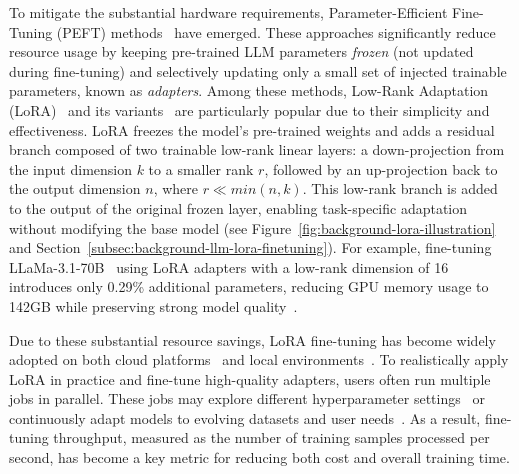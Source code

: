 \begin{sloppypar}
To mitigate the substantial hardware requirements, Parameter-Efficient Fine-Tuning (PEFT) methods~\cite{hu2022lora,li2021prefix-tuning,lester2021prompt-tuning,kopiczko2023vera,liu2024dora,dettmers2023qlora,li2023loftq,ding2023sparse-low-rank-adaptation,houlsby2019peft-learning-nlp,lin2020exploring,ruckle2020adapterdrop,zhao2024apt,zhang2025memory-efficient-lora} have emerged. These approaches significantly reduce resource usage by keeping pre-trained LLM parameters \textit{frozen} (not updated during fine-tuning) and selectively updating only a small set of injected trainable parameters, known as \textit{adapters}.
Among these methods, Low-Rank Adaptation (LoRA)~\cite{hu2022lora} and its variants~\cite{liu2024dora,dettmers2023qlora,li2023loftq,ding2023sparse-low-rank-adaptation} are particularly popular due to their simplicity and effectiveness. 
%
LoRA freezes the model's pre-trained weights and adds a residual branch composed of two trainable low-rank linear layers: a down-projection from the input dimension $k$ to a smaller rank $r$, followed by an up-projection back to the output dimension $n$, where $r \ll min(n, k)$. 
This low-rank branch is added to the output of the original frozen layer, enabling task-specific adaptation without modifying the base model (see Figure~\ref{fig:background-lora-illustration} and Section~\ref{subsec:background-llm-lora-finetuning}).
%
For example, fine-tuning LLaMa-3.1-70B~\cite{llama3.1} using LoRA adapters with a low-rank dimension of 16 introduces only 0.29\% additional parameters, reducing GPU memory usage to 142GB while preserving strong model quality~\cite{dettmers2023qlora,zhang2025memory-efficient-lora}.
\end{sloppypar}

Due to these substantial resource savings, LoRA fine-tuning has become widely adopted on both cloud platforms~\cite{openai-fine-tuning,together-ai-fine-tuning,runpod-fine-tuning,fireworks-fine-tuning} and local environments~\cite{zheng2024llamafactory,llama-cookbook}.
To realistically apply LoRA in practice and fine-tune high-quality adapters, users often run multiple jobs in parallel. These jobs may explore different hyperparameter settings~\cite{tribes2023hyperparameter-instruction-tuning} or continuously adapt models to evolving datasets and user needs~\cite{jindal2024balancing,ibrahim2024simple-continual-pre-training}.
As a result, fine-tuning throughput, measured as the number of training samples processed per second, has become a key metric for reducing both cost and overall training time.


